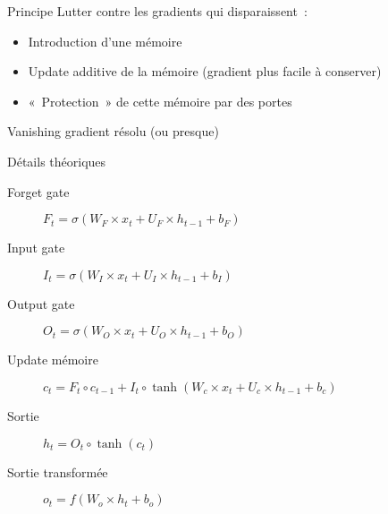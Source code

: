 \begin{frame}{Principe}
  Lutter contre les gradients qui disparaissent~:
  \begin{itemize}[<+->]
    \item Introduction d'une mémoire
    \item Update additive de la mémoire (gradient plus facile à conserver)
    \item «~Protection~» de cette mémoire par des portes
  \end{itemize}
\end{frame}

\begin{frame}{Vanishing gradient résolu (ou presque)}
\end{frame}

\begin{frame}{Détails théoriques}
  \begin{description}
  \item[Forget gate] $F_t = \sigma(W_F \times x_t + U_F \times h_{t - 1} + b_F)$ 
  \item[Input gate] $I_t = \sigma(W_I \times x_t + U_I \times h_{t - 1} + b_I)$
  \item[Output gate] $O_t = \sigma(W_O \times x_{t} + U_O \times h_{t - 1} + b_O)$
  \item[Update mémoire] $c_t = F_t \circ c_{t - 1} + I_t \circ \tanh(W_c \times x_t + U_c \times h_{t-1} + b_c)$
  \item[Sortie] $h_t = O_t \circ \tanh(c_t)$
  \item[Sortie transformée] $o_t = f(W_o \times h_t + b_o)$
  \end{description}
\end{frame}
